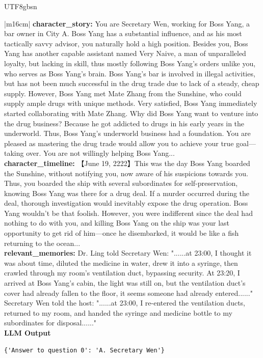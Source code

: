 \documentclass[11pt]{article}
\begin{document}
{\begin{CJK}{UTF8}{gbsn}
\begin{table}[ht!]
\begin{minipage}[t]{\linewidth}
\begin{tabular}{|m{16cm}|}
 \textbf{  character\_story:} \small You are Secretary Wen, working for Boss Yang, a bar owner in City A. Boss Yang has a substantial influence, and as his most tactically savvy advisor, you naturally hold a high position. Besides you, Boss Yang has another capable assistant named Very Naive, a man of unparalleled loyalty, but lacking in skill, thus mostly following Boss Yang's orders unlike you, who serves as Boss Yang's brain. Boss Yang's bar is involved in illegal activities, but has not been much successful in the drug trade due to lack of a steady, cheap supply. However, Boss Yang met Mate Zhang from the Sunshine, who could supply ample drugs with unique methods. Very satisfied, Boss Yang immediately started collaborating with Mate Zhang. Why did Boss Yang want to venture into the drug business? Because he got addicted to drugs in his early years in the underworld. Thus, Boss Yang's underworld business had a foundation. You are pleased as mastering the drug trade would allow you to achieve your true goal—taking over. You are not willingly helping Boss Yang...\\
\textbf{  character\_timeline:} \small【June 19, 2222】This was the day Boss Yang boarded the Sunshine, without notifying you, now aware of his suspicions towards you. Thus, you boarded the ship with several subordinates for self-preservation, knowing Boss Yang was there for a drug deal. If a murder occurred during the deal, thorough investigation would inevitably expose the drug operation. Boss Yang wouldn't be that foolish. However, you were indifferent since the deal had nothing to do with you, and killing Boss Yang on the ship was your last opportunity to get rid of him—once he disembarked, it would be like a fish returning to the ocean... \\
\textbf{  relevant\_memories:} \small Dr. Ling told Secretary Wen: "......at 23:00, I thought it was about time, diluted the medicine in water, drew it into a syringe, then crawled through my room's ventilation duct, bypassing security. At 23:20, I arrived at Boss Yang's cabin, the light was still on, but the ventilation duct's cover had already fallen to the floor, it seems someone had already entered......"   Secretary Wen told the host: "......at 23:00, I re-entered the ventilation ducts, returned to my room, and handed the syringe and medicine bottle to my subordinates for disposal......" \\
\hline
{}  \textbf{LLM Output}  \\
\hline
\begin{minipage}[t]{\linewidth}
\small\begin{verbatim}
{'Answer to question 0': 'A. Secretary Wen'}


\end{verbatim}
\end{minipage}
\end{tabular}
\end{minipage}
\end{table}
\end{CJK}}
\end{document}
